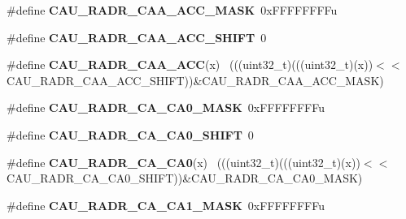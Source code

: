 \begin{DoxyCompactItemize}
\item 
\hypertarget{group___c_a_u___register___masks_ga547665f9f7c6125733272bdba9d975f3}{}\#define {\bfseries C\+A\+U\+\_\+\+R\+A\+D\+R\+\_\+\+C\+A\+A\+\_\+\+A\+C\+C\+\_\+\+M\+A\+S\+K}~0x\+F\+F\+F\+F\+F\+F\+F\+Fu\label{group___c_a_u___register___masks_ga547665f9f7c6125733272bdba9d975f3}

\item 
\hypertarget{group___c_a_u___register___masks_gac2c98d65b03f99b601c30efaec5044f8}{}\#define {\bfseries C\+A\+U\+\_\+\+R\+A\+D\+R\+\_\+\+C\+A\+A\+\_\+\+A\+C\+C\+\_\+\+S\+H\+I\+F\+T}~0\label{group___c_a_u___register___masks_gac2c98d65b03f99b601c30efaec5044f8}

\item 
\hypertarget{group___c_a_u___register___masks_ga05aae6091c2701f8fdbcabd7200ae5c5}{}\#define {\bfseries C\+A\+U\+\_\+\+R\+A\+D\+R\+\_\+\+C\+A\+A\+\_\+\+A\+C\+C}(x)                                        ~(((uint32\+\_\+t)(((uint32\+\_\+t)(x))$<$$<$C\+A\+U\+\_\+\+R\+A\+D\+R\+\_\+\+C\+A\+A\+\_\+\+A\+C\+C\+\_\+\+S\+H\+I\+F\+T))\&C\+A\+U\+\_\+\+R\+A\+D\+R\+\_\+\+C\+A\+A\+\_\+\+A\+C\+C\+\_\+\+M\+A\+S\+K)\label{group___c_a_u___register___masks_ga05aae6091c2701f8fdbcabd7200ae5c5}

\item 
\hypertarget{group___c_a_u___register___masks_ga8839d1ade5765c2f41d1e4666bb039ef}{}\#define {\bfseries C\+A\+U\+\_\+\+R\+A\+D\+R\+\_\+\+C\+A\+\_\+\+C\+A0\+\_\+\+M\+A\+S\+K}~0x\+F\+F\+F\+F\+F\+F\+F\+Fu\label{group___c_a_u___register___masks_ga8839d1ade5765c2f41d1e4666bb039ef}

\item 
\hypertarget{group___c_a_u___register___masks_ga56a6980d68ebf41b5b321ed2a9211c1e}{}\#define {\bfseries C\+A\+U\+\_\+\+R\+A\+D\+R\+\_\+\+C\+A\+\_\+\+C\+A0\+\_\+\+S\+H\+I\+F\+T}~0\label{group___c_a_u___register___masks_ga56a6980d68ebf41b5b321ed2a9211c1e}

\item 
\hypertarget{group___c_a_u___register___masks_gadab502f84e7e3754100680ee4eb4d497}{}\#define {\bfseries C\+A\+U\+\_\+\+R\+A\+D\+R\+\_\+\+C\+A\+\_\+\+C\+A0}(x)                                          ~(((uint32\+\_\+t)(((uint32\+\_\+t)(x))$<$$<$C\+A\+U\+\_\+\+R\+A\+D\+R\+\_\+\+C\+A\+\_\+\+C\+A0\+\_\+\+S\+H\+I\+F\+T))\&C\+A\+U\+\_\+\+R\+A\+D\+R\+\_\+\+C\+A\+\_\+\+C\+A0\+\_\+\+M\+A\+S\+K)\label{group___c_a_u___register___masks_gadab502f84e7e3754100680ee4eb4d497}

\item 
\hypertarget{group___c_a_u___register___masks_ga7d2e754db6dd6dae2933a852f15a6f60}{}\#define {\bfseries C\+A\+U\+\_\+\+R\+A\+D\+R\+\_\+\+C\+A\+\_\+\+C\+A1\+\_\+\+M\+A\+S\+K}~0x\+F\+F\+F\+F\+F\+F\+F\+Fu\label{group___c_a_u___register___masks_ga7d2e754db6dd6dae2933a852f15a6f60}


\end{DoxyCompactItemize}

